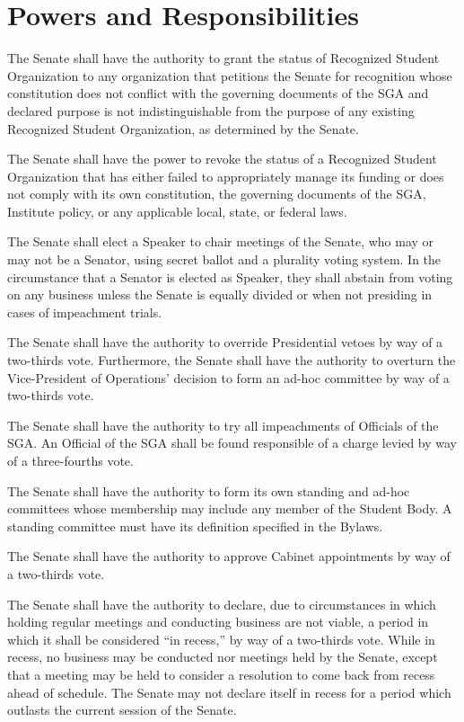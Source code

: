 \documentclass[12pt,oneside]{scrreprt}
\begin{document}
\section{Powers and Responsibilities}
The Senate shall have the authority to grant the status of Recognized Student Organization to any organization that petitions the Senate for recognition whose constitution does not conflict with the governing documents of the SGA and declared purpose is not indistinguishable from the purpose of any existing Recognized Student Organization, as determined by the Senate.

The Senate shall have the power to revoke the status of a Recognized Student Organization that has either failed to appropriately manage its funding or does not comply with its own constitution, the governing documents of the SGA, Institute policy, or any applicable local, state, or federal laws. 

The Senate shall elect a Speaker to chair meetings of the Senate, who may or may not be a Senator, using secret ballot and a plurality voting system. In the circumstance that a Senator is elected as Speaker, they shall abstain from voting on any business unless the Senate is equally divided or when not presiding in cases of impeachment trials.

The Senate shall have the authority to override Presidential vetoes by way of a two-thirds vote. Furthermore, the Senate shall have the authority to overturn the Vice-President of Operations' decision to form an ad-hoc committee by way of a two-thirds vote.

The Senate shall have the authority to try all impeachments of Officials of the SGA. An Official of the SGA shall be found responsible of a charge levied by way of a three-fourths vote.

The Senate shall have the authority to form its own standing and ad-hoc committees whose membership may include any member of the Student Body. A standing committee must have its definition specified in the Bylaws. 

The Senate shall have the authority to approve Cabinet appointments by way of a two-thirds vote.

The Senate shall have the authority to declare, due to circumstances in which holding regular meetings and conducting business are not viable, a period in which it shall be considered ``in recess,'' by way of a two-thirds vote. While in recess, no business may be conducted nor meetings held by the Senate, except that a meeting may be held to consider a resolution to come back from recess ahead of schedule. The Senate may not declare itself in recess for a period which outlasts the current session of the Senate.
\end{document}
